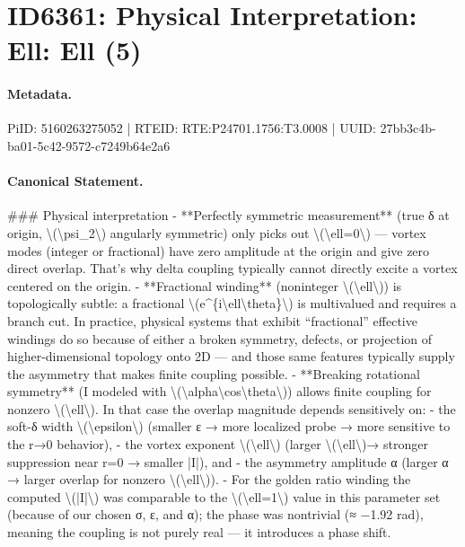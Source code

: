 \section*{ID6361: Physical Interpretation: Ell: Ell (5)}
\paragraph{Metadata.}
PiID: 5160263275052 | RTEID: RTE:P24701.1756:T3.0008 | UUID: 27bb3c4b-ba01-5c42-9572-c7249b64e2a6

\paragraph{Canonical Statement.}
\#\#\# Physical interpretation - **Perfectly symmetric measurement** (true δ at origin, \textbackslash{}(\textbackslash{}psi\_2\textbackslash{}) angularly symmetric) only picks out \textbackslash{}(\textbackslash{}ell=0\textbackslash{}) — vortex modes (integer or fractional) have zero amplitude at the origin and give zero direct overlap. That’s why delta coupling typically cannot directly excite a vortex centered on the origin. - **Fractional winding** (noninteger \textbackslash{}(\textbackslash{}ell\textbackslash{})) is topologically subtle: a fractional \textbackslash{}(e\textasciicircum{}\{i\textbackslash{}ell\textbackslash{}theta\}\textbackslash{}) is multivalued and requires a branch cut. In practice, physical systems that exhibit “fractional” effective windings do so because of either a broken symmetry, defects, or projection of higher-dimensional topology onto 2D — and those same features typically supply the asymmetry that makes finite coupling possible. - **Breaking rotational symmetry** (I modeled with \textbackslash{}(\textbackslash{}alpha\textbackslash{}cos\textbackslash{}theta\textbackslash{})) allows finite coupling for nonzero \textbackslash{}(\textbackslash{}ell\textbackslash{}). In that case the overlap magnitude depends sensitively on: - the soft-δ width \textbackslash{}(\textbackslash{}epsilon\textbackslash{}) (smaller ε → more localized probe → more sensitive to the r→0 behavior), - the vortex exponent \textbackslash{}(\textbackslash{}ell\textbackslash{}) (larger \textbackslash{}(\textbackslash{}ell\textbackslash{})→ stronger suppression near r=0 → smaller |I|), and - the asymmetry amplitude α (larger α → larger overlap for nonzero \textbackslash{}(\textbackslash{}ell\textbackslash{})). - For the golden ratio winding the computed \textbackslash{}(|I|\textbackslash{}) was comparable to the \textbackslash{}(\textbackslash{}ell=1\textbackslash{}) value in this parameter set (because of our chosen σ, ε, and α); the phase was nontrivial (≈ −1.92 rad), meaning the coupling is not purely real — it introduces a phase shift.


